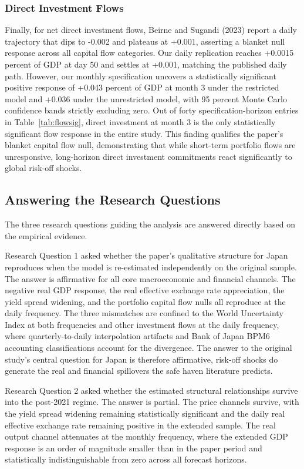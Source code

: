 \subsubsection{Direct Investment Flows}

Finally, for net direct investment flows, Beirne and Sugandi (2023) report a daily trajectory that dips to -0.002 and plateaus at +0.001, asserting a blanket null response across all capital flow categories. Our daily replication reaches +0.0015 percent of GDP at day 50 and settles at +0.001, matching the published daily path. However, our monthly specification uncovers a statistically significant positive response of +0.043 percent of GDP at month 3 under the restricted model and +0.036 under the unrestricted model, with 95 percent Monte Carlo confidence bands strictly excluding zero. Out of forty specification-horizon entries in Table~\ref{tab:flowsig}, direct investment at month 3 is the only statistically significant flow response in the entire study. This finding qualifies the paper's blanket capital flow null, demonstrating that while short-term portfolio flows are unresponsive, long-horizon direct investment commitments react significantly to global risk-off shocks.

\subsection{Answering the Research Questions}

The three research questions guiding the analysis are answered directly based on the empirical evidence.

Research Question 1 asked whether the paper's qualitative structure for Japan reproduces when the model is re-estimated independently on the original sample. The answer is affirmative for all core macroeconomic and financial channels. The negative real GDP response, the real effective exchange rate appreciation, the yield spread widening, and the portfolio capital flow nulls all reproduce at the daily frequency. The three mismatches are confined to the World Uncertainty Index at both frequencies and other investment flows at the daily frequency, where quarterly-to-daily interpolation artifacts and Bank of Japan BPM6 accounting classifications account for the divergence. The answer to the original study's central question for Japan is therefore affirmative, risk-off shocks do generate the real and financial spillovers the safe haven literature predicts.

Research Question 2 asked whether the estimated structural relationships survive into the post-2021 regime. The answer is partial. The price channels survive, with the yield spread widening remaining statistically significant and the daily real effective exchange rate remaining positive in the extended sample. The real output channel attenuates at the monthly frequency, where the extended GDP response is an order of magnitude smaller than in the paper period and statistically indistinguishable from zero across all forecast horizons.

